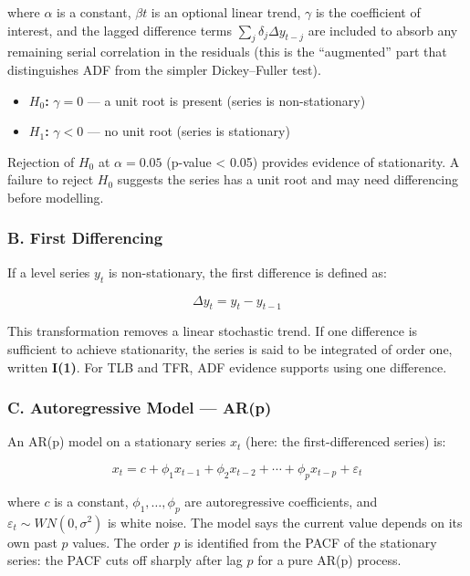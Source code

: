 \documentclass[
]{article}
\providecommand{\tightlist}{%
  \setlength{\itemsep}{0pt}\setlength{\parskip}{0pt}}
\begin{document}
where \(\alpha\) is a constant, \(\beta t\) is an optional linear trend,
\(\gamma\) is the coefficient of interest, and the lagged difference
terms \(\sum_j \delta_j \Delta y_{t-j}\) are included to absorb any
remaining serial correlation in the residuals (this is the ``augmented''
part that distinguishes ADF from the simpler Dickey--Fuller test).

\begin{itemize}
\tightlist
\item
  \textbf{\(H_0\):} \(\gamma = 0\) --- a unit root is present (series is
  non-stationary)\\
\item
  \textbf{\(H_1\):} \(\gamma < 0\) --- no unit root (series is
  stationary)
\end{itemize}

Rejection of \(H_0\) at \(\alpha = 0.05\) (p-value \textless{} 0.05)
provides evidence of stationarity. A failure to reject \(H_0\) suggests
the series has a unit root and may need differencing before modelling.

\subsubsection{B. First Differencing}\label{b.-first-differencing}

If a level series \(y_t\) is non-stationary, the first difference is
defined as:

\[
\Delta y_t = y_t - y_{t-1}
\]

This transformation removes a linear stochastic trend. If one difference
is sufficient to achieve stationarity, the series is said to be
integrated of order one, written \textbf{I(1)}. For TLB and TFR, ADF
evidence supports using one difference.

\subsubsection{C. Autoregressive Model ---
AR(p)}\label{c.-autoregressive-model-arp}

An AR(p) model on a stationary series \(x_t\) (here: the
first-differenced series) is:

\[
x_t = c + \phi_1 x_{t-1} + \phi_2 x_{t-2} + \cdots + \phi_p x_{t-p} + \varepsilon_t
\]

where \(c\) is a constant, \(\phi_1, \ldots, \phi_p\) are autoregressive
coefficients, and \(\varepsilon_t \sim WN(0, \sigma^2)\) is white noise.
The model says the current value depends on its own past \(p\) values.
The order \(p\) is identified from the PACF of the stationary series:
the PACF cuts off sharply after lag \(p\) for a pure AR(p) process.
\end{document}
